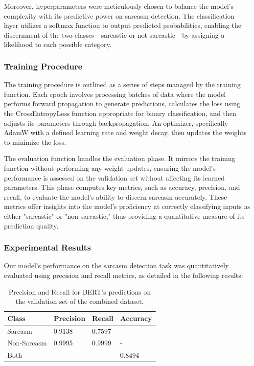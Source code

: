 \documentclass[10pt,twocolumn,letterpaper]{article}
\begin{document}
Moreover, hyperparameters were meticulously chosen to balance the model's complexity with its predictive power on sarcasm detection. The classification layer utilizes a softmax function to output predicted probabilities, enabling the discernment of the two classes—sarcastic or not sarcastic—by assigning a likelihood to each possible category.

\subsubsection{Training Procedure}
The training procedure is outlined as a series of steps managed by the training function. Each epoch involves processing batches of data where the model performs forward propagation to generate predictions, calculates the loss using the CrossEntropyLoss function appropriate for binary classification, and then adjusts its parameters through backpropagation. An optimizer, specifically AdamW with a defined learning rate and weight decay, then updates the weights to minimize the loss.

The evaluation function handles the evaluation phase. It mirrors the training function without performing any weight updates, ensuring the model's performance is assessed on the validation set without affecting its learned parameters. This phase computes key metrics, such as accuracy, precision, and recall, to evaluate the model's ability to discern sarcasm accurately. These metrics offer insights into the model's proficiency at correctly classifying inputs as either "sarcastic" or "non-sarcastic," thus providing a quantitative measure of its prediction quality.

\subsubsection{Experimental Results}
Our model's performance on the sarcasm detection task was quantitatively evaluated using precision and recall metrics, as detailed in the following results:

\begin{table}[H]  
    \centering  
    \begin{tabularx}{\linewidth}{|X|X|X|X|}  
        \hline  
        Class & Precision & Recall & Accuracy \\  
        \hline  
        Sarcasm & 0.9138 & 0.7597 & - \\  
        \hline  
        Non-Sarcasm & 0.9995 & 0.9999 & - \\  
        \hline  
        Both & - & - & 0.8494 \\  
        \hline  
    \end{tabularx}  
    \caption{Precision and Recall for BERT's predictions on the validation set of the combined dataset.}  
\end{table}
\end{document}
